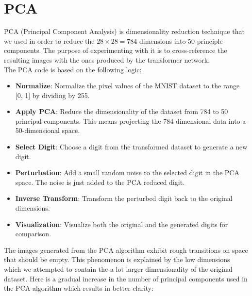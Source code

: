 \documentclass[lettersize,journal]{IEEEtran}
\begin{document}
\section{PCA}
PCA (Principal Component Analysis) is dimensionality reduction technique that we used in order to
reduce the $28 \times 28 = 784$ dimensions into 50 principle components. The purpose of experimenting 
with it is to cross-reference the resulting images with the ones produced by the transformer network.\\
The PCA code is based on the following logic:
\begin{itemize}
    \item \textbf{Normalize}: Normalize the pixel values of the MNIST dataset to the range [0, 1] by
    dividing by 255.
    \item \textbf{Apply PCA}: Reduce the dimensionality of the dataset from 784 to 50 principal components.
    This means projecting the 784-dimensional data into a 50-dimensional space.
    \item \textbf{Select Digit}: Choose a digit from the transformed dataset to generate a new digit.
    \item \textbf{Perturbation}: Add a small random noise to the selected digit in the PCA space. The 
    noise is just added to the PCA reduced digit. 
    \item \textbf{Inverse Transform}: Transform the perturbed digit back to the original dimensions.
    \item \textbf{Visualization}: Visualize both the original and the generated digits for comparison.
\end{itemize}
The images generated from the PCA algorithm exhibit rough transitions on space that should be empty.
This phenomenon is explained by the low dimensions which we attempted to contain the a lot larger 
dimensionality of the original dataset. Here is a gradual increase in the number of principal components
used in the PCA algorithm which results in better clarity:
\end{document}
